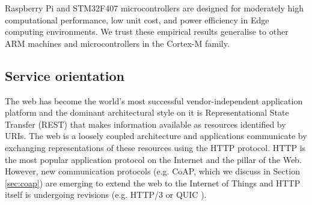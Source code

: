 Raspberry Pi and STM32F407 microcontrollers are designed for moderately high computational performance, low unit cost, and power efficiency in Edge computing environments. We trust these empirical results generalise to other ARM machines and microcontrollers in the Cortex-M family.

\subsection{Service orientation}

The web has become the world's most successful vendor-independent application platform and the dominant architectural style on it is Representational State Transfer (REST) \cite{rest} that makes information available as resources identified by URIs. The web is a loosely coupled architecture and applications communicate by exchanging representations of these resources using the HTTP protocol. HTTP is the most popular application protocol on the Internet and the pillar of the Web. However, new communication protocols (e.g. CoAP, which we discuss in Section \ref{sec:coap}) are emerging to extend the web to the Internet of Things and HTTP itself is undergoing revisions (e.g. HTTP/3 or QUIC \cite{langley2017quic}).

